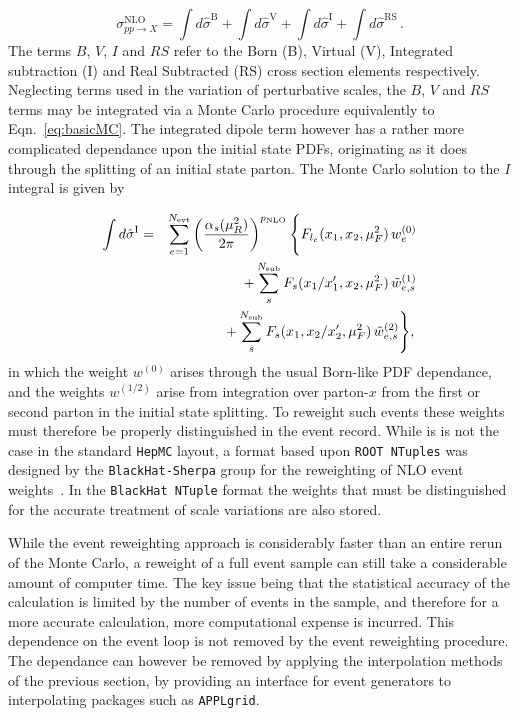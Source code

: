 \begin{equation}
  \label{eq:NLOxsect}
  \sigma_{pp\to X}^{\text{NLO}}= \int d\hat{\sigma}^\mathrm{B}
  + \int d\hat{\sigma}^\mathrm{V}
  + \int d\hat{\sigma}^\mathrm{I}
  + \int d\hat{\sigma}^\mathrm{RS}
  \, .
\end{equation}
The terms $B$, $V$, $I$ and $RS$ refer to the Born (B), Virtual (V), Integrated subtraction (I) and Real Subtracted (RS) cross section elements respectively. Neglecting terms used in the variation of perturbative scales, the $B$, $V$ and $RS$ terms may be integrated via a Monte Carlo procedure equivalently to Eqn.~\ref{eq:basicMC}. The integrated dipole term however has a rather more complicated dependance upon the initial state PDFs, originating as it does through the splitting of an initial state parton. The Monte Carlo solution to the $I$ integral is given by 

\def\varref#1{{\tt #1}}
\begin{eqnarray}
 \int d\hat{\sigma}^\mathrm{I}  &=&  \sum_{e=1}^{N_{\mathrm{evt}}}   \left(  {{\alpha_s(\mu_R^2)}\over {2\pi}} \right)^{p_{\text{NLO}}} \Bigg\{  F_{l_e}(x_1,x_2,\mu^2_F)\,  w^{(0)}_e 
\nonumber\\
&&+\sum_{s}^{N_{\text{sub}}} F_s(x_1/x'_1, x_2, \mu^2_F)\, \tilde{w}^{(1)}_{e,s} \label{eq:NTupleBreakdown} \\
&&+\sum_{s}^{N_{\text{sub}}} F_s(x_1, x_2/x'_2, \mu^2_F)\, \tilde{w}^{(2)}_{e,s}
 \Bigg\},
  \, \nonumber 
\end{eqnarray}
in which the weight $w^{(0)}$ arises through the usual Born-like PDF dependance, and the weights $w^{(1/2)}$ arise from integration over parton-$x$ from the first or second parton in the initial state splitting. To reweight such events these weights must therefore be properly distinguished
in the event record. While is is not the case in the standard {\tt HepMC} layout, a format based upon {\tt ROOT NTuples} was designed by the {\tt BlackHat-Sherpa} group for the reweighting of NLO event weights~\cite{Bern:2013zja}. In the {\tt BlackHat NTuple} format the weights that must be distinguished for the accurate treatment of scale variations are also stored.  

While the event reweighting approach is considerably faster than an entire rerun of the Monte Carlo, a reweight of a full event sample can still take a considerable amount of computer time. The key issue being that the statistical accuracy of the calculation is limited by the number of events in the sample, and therefore for a more accurate calculation, more computational expense is incurred. This dependence on the event loop is not removed by the event reweighting procedure. The dependance can however be removed by applying the interpolation methods of the previous section, by providing an interface for event generators to interpolating packages such as { \tt APPLgrid}.

